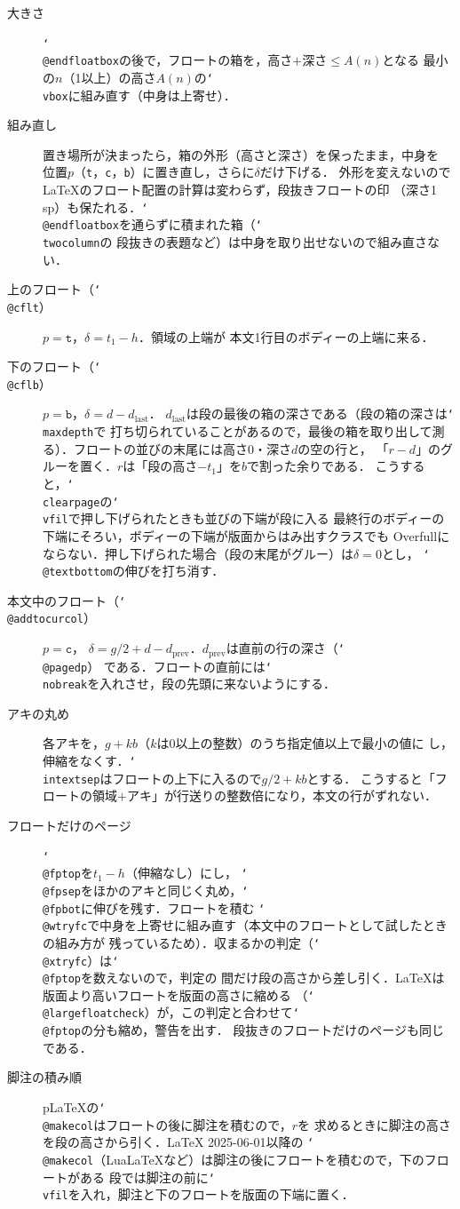 \documentclass[paper=a4,dvipdfmx]{jlreq}
\newcommand\opt[1]{\texttt{#1}}
\newcommand\cs[1]{\texttt{\char`\\#1}}
\begin{document}
\begin{description}
\item[大きさ] \cs{@endfloatbox}の後で，フロートの箱を，高さ$+$深さ$\le A(n)$となる
  最小の$n$（1以上）の高さ$A(n)$の\cs{vbox}に組み直す（中身は上寄せ）．
\item[組み直し] 置き場所が決まったら，箱の外形（高さと深さ）を保ったまま，中身を
  位置$p$（\opt{t}，\opt{c}，\opt{b}）に置き直し，さらに$\delta$だけ下げる．
  外形を変えないので\LaTeX{}のフロート配置の計算は変わらず，段抜きフロートの印
  （深さ1\,sp）も保たれる．\cs{@endfloatbox}を通らずに積まれた箱（\cs{twocolumn}の
  段抜きの表題など）は中身を取り出せないので組み直さない．
\item[上のフロート（\cs{@cflt}）] $p=\opt{t}$，$\delta=t_1-h$．領域の上端が
  本文1行目のボディーの上端に来る．
\item[下のフロート（\cs{@cflb}）] $p=\opt{b}$，$\delta=d-d_{\mathrm{last}}$．
  $d_{\mathrm{last}}$は段の最後の箱の深さである（段の箱の深さは\cs{maxdepth}で
  打ち切られていることがあるので，最後の箱を取り出して測る）．フロートの並びの末尾には高さ0・深さ$d$の空の行と，
  「$r-d$」のグルーを置く．$r$は「段の高さ$-t_1$」を$b$で割った余りである．
  こうすると，\cs{clearpage}の\cs{vfil}で押し下げられたときも並びの下端が段に入る
  最終行のボディーの下端にそろい，ボディーの下端が版面からはみ出すクラスでも
  Overfullにならない．押し下げられた場合（段の末尾がグルー）は$\delta=0$とし，
  \cs{@textbottom}の伸びを打ち消す．
\item[本文中のフロート（\cs{@addtocurcol}）] $p=\opt{c}$，
  $\delta=g/2+d-d_{\mathrm{prev}}$．$d_{\mathrm{prev}}$は直前の行の深さ（\cs{@pagedp}）
  である．フロートの直前には\cs{nobreak}を入れさせ，段の先頭に来ないようにする．
\item[アキの丸め] 各アキを，$g+kb$（$k$は0以上の整数）のうち指定値以上で最小の値に
  し，伸縮をなくす．\cs{intextsep}はフロートの上下に入るので$g/2+kb$とする．
  こうすると「フロートの領域$+$アキ」が行送りの整数倍になり，本文の行がずれない．
\item[フロートだけのページ] \cs{@fptop}を$t_1-h$（伸縮なし）にし，
  \cs{@fpsep}をほかのアキと同じく丸め，\cs{@fpbot}に伸びを残す．フロートを積む
  \cs{@wtryfc}で中身を上寄せに組み直す（本文中のフロートとして試したときの組み方が
  残っているため）．収まるかの判定（\cs{@xtryfc}）は\cs{@fptop}を数えないので，判定の
  間だけ段の高さから差し引く．\LaTeX{}は版面より高いフロートを版面の高さに縮める
  （\cs{@largefloatcheck}）が，この判定と合わせて\cs{@fptop}の分も縮め，警告を出す．
  段抜きのフロートだけのページも同じである．
\item[脚注の積み順] pLaTeXの\cs{@makecol}はフロートの後に脚注を積むので，$r$を
  求めるときに脚注の高さを段の高さから引く．\LaTeX{} 2025-06-01以降の
  \cs{@makecol}（LuaLaTeXなど）は脚注の後にフロートを積むので，下のフロートがある
  段では脚注の前に\cs{vfil}を入れ，脚注と下のフロートを版面の下端に置く．
\end{description}
\end{document}
